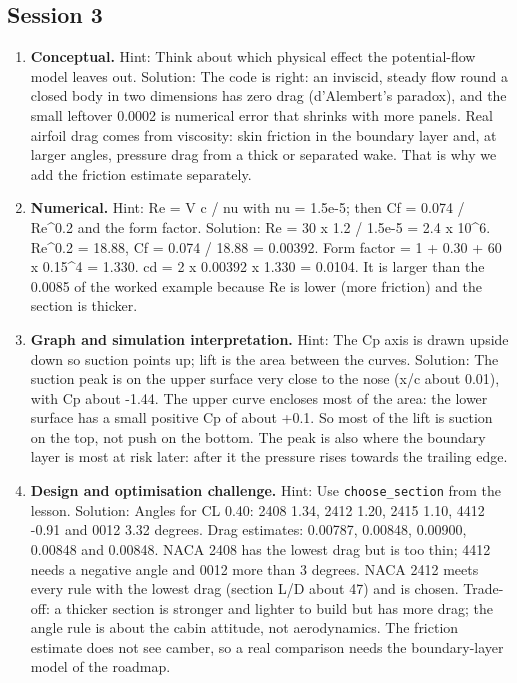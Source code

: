 \documentclass[11pt,a4paper]{article}
\begin{document}
\subsection*{Session 3}
\begin{enumerate}[nosep]
\item \textbf{Conceptual.} Hint: Think about which physical effect the potential-flow model leaves out. Solution: The code is right: an inviscid, steady flow round a closed body in two dimensions has zero drag (d'Alembert's paradox), and the small leftover 0.0002 is numerical error that shrinks with more panels. Real airfoil drag comes from viscosity: skin friction in the boundary layer and, at larger angles, pressure drag from a thick or separated wake. That is why we add the friction estimate separately.
\item \textbf{Numerical.} Hint: Re = V c / nu with nu = 1.5e-5; then Cf = 0.074 / Re\textasciicircum{}0.2 and the form factor. Solution: Re = 30 x 1.2 / 1.5e-5 = 2.4 x 10\textasciicircum{}6. Re\textasciicircum{}0.2 = 18.88, Cf = 0.074 / 18.88 = 0.00392. Form factor = 1 + 0.30 + 60 x 0.15\textasciicircum{}4 = 1.330. cd = 2 x 0.00392 x 1.330 = 0.0104. It is larger than the 0.0085 of the worked example because Re is lower (more friction) and the section is thicker.
\item \textbf{Graph and simulation interpretation.} Hint: The Cp axis is drawn upside down so suction points up; lift is the area between the curves. Solution: The suction peak is on the upper surface very close to the nose (x/c about 0.01), with Cp about -1.44. The upper curve encloses most of the area: the lower surface has a small positive Cp of about +0.1. So most of the lift is suction on the top, not push on the bottom. The peak is also where the boundary layer is most at risk later: after it the pressure rises towards the trailing edge.
\item \textbf{Design and optimisation challenge.} Hint: Use \texttt{choose\_section} from the lesson. Solution: Angles for CL 0.40: 2408 1.34, 2412 1.20, 2415 1.10, 4412 -0.91 and 0012 3.32 degrees. Drag estimates: 0.00787, 0.00848, 0.00900, 0.00848 and 0.00848. NACA 2408 has the lowest drag but is too thin; 4412 needs a negative angle and 0012 more than 3 degrees. NACA 2412 meets every rule with the lowest drag (section L/D about 47) and is chosen. Trade-off: a thicker section is stronger and lighter to build but has more drag; the angle rule is about the cabin attitude, not aerodynamics. The friction estimate does not see camber, so a real comparison needs the boundary-layer model of the roadmap.
\end{enumerate}
\end{document}
